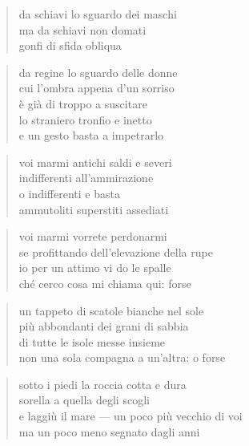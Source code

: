 \clearpage


\begin{verse}
    da schiavi lo sguardo dei maschi\\
    ma da schiavi non domati\\
    gonfi di sfida obliqua
\end{verse}

\begin{verse}
    da regine lo sguardo delle donne\\
    cui l'ombra appena d'un sorriso\\
    è già di troppo a suscitare\\
    lo straniero tronfio e inetto\\
    e un gesto basta a impetrarlo
\end{verse}

\clearpage


\begin{verse}
    voi marmi antichi saldi e severi\\
    indifferenti all'ammirazione\\
    o indifferenti e basta\\
    ammutoliti superstiti assediati
\end{verse}

\begin{verse}
    voi marmi vorrete perdonarmi\\
    se profittando dell'elevazione della rupe\\
    io per un attimo vi do le spalle\\
    ché cerco cosa mi chiama qui: forse
\end{verse}

\begin{verse}
    un tappeto di scatole bianche nel sole\\
    più abbondanti dei grani di sabbia\\
    di tutte le isole messe insieme\\
    non una sola compagna a un'altra: o forse
\end{verse}

\begin{verse}
    sotto i piedi la roccia cotta e dura\\
    sorella a quella degli scogli\\
    e laggiù il mare — un poco più vecchio di voi\\
    ma un poco meno segnato dagli anni
\end{verse}
